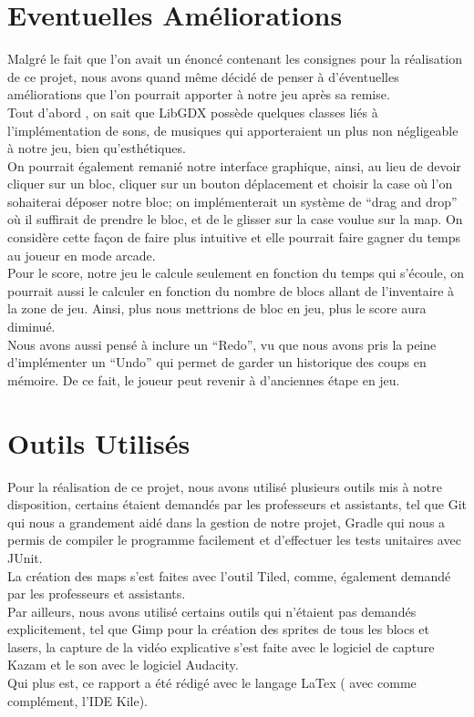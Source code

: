\documentclass[a4paper,10pt]{article}
\begin{document}
\section{Eventuelles Améliorations}
Malgré le fait que l'on avait un énoncé contenant les consignes pour la réalisation de ce projet, nous avons quand même décidé de penser à d'éventuelles
améliorations que l'on pourrait apporter à notre jeu après sa remise.\\
Tout d'abord , on sait que LibGDX possède quelques classes liés à l'implémentation de sons, de musiques qui apporteraient un plus
non négligeable à notre jeu, bien qu'esthétiques.\\
On pourrait également remanié notre interface graphique, ainsi, au lieu de devoir cliquer sur un bloc, cliquer sur un bouton déplacement
et choisir la case où l'on sohaiterai déposer notre bloc; on implémenterait un système de ``drag and drop'' où il suffirait de prendre le bloc,
et de le glisser sur la case voulue sur la map. On considère cette façon de faire plus intuitive et elle pourrait faire gagner du temps au joueur
en mode arcade.\\
Pour le score, notre jeu le calcule seulement en fonction du temps qui s'écoule, on pourrait aussi le calculer en fonction du nombre de blocs allant
de l'inventaire à la zone de jeu. Ainsi, plus nous mettrions de bloc en jeu, plus le score aura diminué. \\
Nous avons aussi pensé à inclure un ``Redo'', vu que nous avons pris la peine d'implémenter un ``Undo'' qui permet de garder un historique des coups en
mémoire. De ce fait, le joueur peut revenir à d'anciennes étape en jeu.

\section{Outils Utilisés}
Pour la réalisation de ce projet, nous avons utilisé plusieurs outils mis à notre disposition, certains étaient demandés par les professeurs et assistants,
tel que Git qui nous a grandement aidé dans la gestion de notre projet, Gradle qui nous a permis de compiler le programme facilement et d'effectuer les tests unitaires
avec JUnit.\\
La création des maps s'est faites avec l'outil Tiled, comme, également demandé par les professeurs et assistants. \\

Par ailleurs, nous avons utilisé certains outils qui n'étaient pas demandés explicitement, tel que Gimp pour la création des sprites de tous les blocs et lasers,
la capture de la vidéo explicative s'est faite avec le logiciel de capture Kazam et le son avec le logiciel Audacity.\\
Qui plus est, ce rapport a été rédigé avec le langage LaTex ( avec comme complément, l'IDE Kile).
\end{document}

